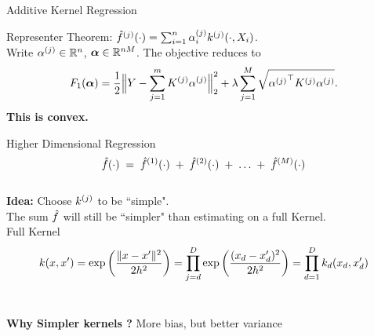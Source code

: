 \begin{frame}{Additive Kernel Regression}

Representer Theorem: $\hat{f}^{(j)}(\cdot) = \sum_{i=1}^n \alpha_i^{(j)}
k^{(j)}(\cdot,X_i)$. \\[0.6in]
\pause
Write ${\alpha^{(j)}} \in \mathbb{R}^n$, ${\bm{\alpha}} \in \mathbb{R}^{nM}$. The objective reduces to
\begin{equation*}
F_1({\bm{\alpha}}) = \frac{1}{2}\Big\|Y - \sum_{j=1}^m {K^{(j)}} {\alpha^{(j)}}\Big\|_2^2 + 
  \lambda \sum_{j=1}^M \sqrt{{{\alpha^{(j)}}}^\top {K^{(j)}} {\alpha^{(j)}}}.
\end{equation*} 
\vspace{0.1in}
\textbf{This is convex.}

\end{frame}



\begin{frame}{Higher Dimensional Regression}
  \[
    \hat{f}(\cdot) \;=\; \hat{f}^{(1)}(\cdot)\; +\;  
      \hat{f}^{(2)}(\cdot)\;+\;\dots \;+\; \hat{f}^{(M)}(\cdot)
  \] \\
\vspace{0.2in}
\pause
\textbf{Idea:} Choose $k^{(j)}$ to be ``simple".  \\
The sum $\hat{f}$ will still be
``simpler" than estimating on a full Kernel.\\
\pause
\vspace{0.2in}
Full Kernel
\[
k(x,x') = \exp\left( \frac{\|x-x'\|^2}{2h^2} \right)
= \prod_{j=d}^D \exp\left( \frac{(x_d-x_d')^2}{2h^2} \right)
= \prod_{d=1}^D k_d(x_d, x'_d)
\]\\
\vspace{0.2in}
\pause

\textbf{Why Simpler kernels ?} More bias, but better variance 


\end{frame}



